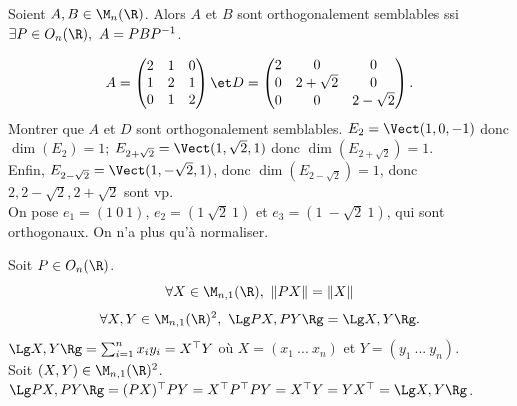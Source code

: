 \documentclass[11pt]{article}
\begin{document}
\vspace*{-0.8cm}

\begin{defi}{}{}
    Soient $A,B\in\M_n(\R)$. Alors $A$ et $B$ sont orthogonalement semblables ssi $\exists P \in O_n(\R), ~ A=PBP^{-1}$.
\end{defi}

\vspace*{-0.8cm}

\begin{ex}{}{}
    \begin{equation*}
        A=\begin{pmatrix}2&1&0\\1&2&1\\0&1&2\end{pmatrix} \et D = \begin{pmatrix}2&0&0\\0&2+\sqrt{2}&0\\0&0&2-\sqrt{2}\end{pmatrix}.
    \end{equation*}
    Montrer que $A$ et $D$ sont orthogonalement semblables.
    \tcblower
    $E_2 = \Vect(1,0,-1)$ donc $\dim(E_2)=1$; $E_{2+\sqrt{2}}=\Vect(1,\sqrt{2},1)$ donc $\dim(E_{2+\sqrt{2}})=1$.\\
    Enfin, $E_{2-\sqrt{2}}=\Vect(1,-\sqrt{2},1)$, donc $\dim(E_{2-\sqrt{2}})=1$, donc $2,2-\sqrt{2},2+\sqrt{2}$ sont vp.\\
    On pose $e_1=(1~0~1)$, $e_2=(1~\sqrt{2}~1)$ et $e_3=(1~-\sqrt{2}~1)$, qui sont orthogonaux. On n'a plus qu'à normaliser.
\end{ex}

\begin{prop}{}{}
    Soit $P\in O_n(\R)$.
    \begin{equation*}
        \forall X \in \M_{n,1}(\R), ~ \|PX\|=\|X\|
    \end{equation*}
    \begin{equation*}
        \forall X,Y \in \M_{n,1}(\R)^2, ~ \Lg PX, PY\Rg = \Lg X,Y \Rg.
    \end{equation*}
    \tcblower
    $\Lg X,Y\Rg = \sum_{i=1}^nx_iy_i=X^\top Y$ où $X=(x_1~...~x_n)$ et $Y=(y_1~...~y_n)$.\\
    Soit $(X,Y)\in\M_{n,1}(\R)^2$. $\Lg PX, PY \Rg = (PX)^\top PY = X^\top P^\top PY =X^\top Y = YX^\top = \Lg X,Y\Rg$.
\end{prop}

\vspace*{-0.8cm}
\end{document}
